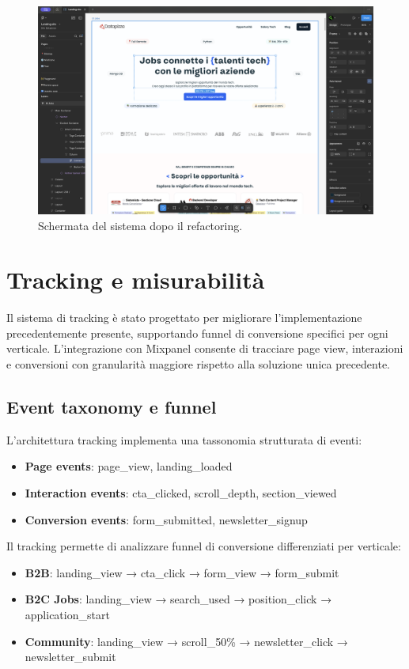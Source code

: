 \begin{figure}[h!]
    \centering
    \includegraphics[width=1\textwidth]{chapters/figures/screenMockup.png}
    \caption{Schermata del sistema dopo il refactoring.}
    \label{fig:refactoring}
\end{figure}

\section{Tracking e misurabilità}
Il sistema di tracking è stato progettato per migliorare l'implementazione 
precedentemente presente, supportando funnel di conversione specifici per ogni 
verticale. L'integrazione con Mixpanel consente di tracciare page view, 
interazioni e conversioni con granularità maggiore rispetto alla soluzione unica 
precedente.

\subsection{Event taxonomy e funnel}
L'architettura tracking implementa una tassonomia strutturata di eventi:
\begin{itemize}
  \item \textbf{Page events}: page\_view, landing\_loaded
  \item \textbf{Interaction events}: cta\_clicked, scroll\_depth, section\_viewed
  \item \textbf{Conversion events}: form\_submitted, newsletter\_signup
\end{itemize}

Il tracking permette di analizzare funnel di conversione differenziati per verticale:
\begin{itemize}
  \item \textbf{B2B}: landing\_view → cta\_click → form\_view → form\_submit
  \item \textbf{B2C Jobs}: landing\_view → search\_used → position\_click → application\_start
  \item \textbf{Community}: landing\_view → scroll\_50\% → newsletter\_click → newsletter\_submit
\end{itemize}

